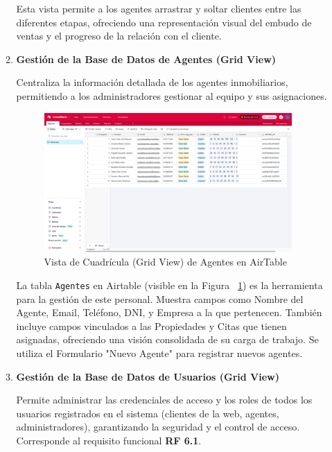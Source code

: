 \begin{enumerate}
\begin{enumerate}
        Esta vista permite a los agentes arrastrar y soltar clientes entre las diferentes etapas, ofreciendo una representación visual del embudo de ventas y el progreso de la relación con el cliente.
        
        \item \textbf{Gestión de la Base de Datos de Agentes (Grid View)}
        
        Centraliza la información detallada de los agentes inmobiliarios, permitiendo a los administradores gestionar al equipo y sus asignaciones.

        \begin{figure}[H]
            \begin{center}
                \includegraphics[width = 0.95\textwidth]{Figuras/gridviewagentesairtable.png}
            \end{center}
            \caption{\label{fig:gridviewagentesairtable} Vista de Cuadrícula (Grid View) de Agentes en AirTable}
        \end{figure}

        La tabla \texttt{Agentes} en Airtable (visible en la Figura ~\ref{fig:gridviewagentesairtable}) es la herramienta para la gestión de este personal. Muestra campos como Nombre del Agente, Email, Teléfono, DNI, y Empresa a la que pertenecen. También incluye campos vinculados a las Propiedades y Citas que tienen asignadas, ofreciendo una visión consolidada de su carga de trabajo. Se utiliza el Formulario "Nuevo Agente" para registrar nuevos agentes.

        \item \textbf{Gestión de la Base de Datos de Usuarios (Grid View)}
        
        Permite administrar las credenciales de acceso y los roles de todos los usuarios registrados en el sistema (clientes de la web, agentes, administradores), garantizando la seguridad y el control de acceso. Corresponde al requisito funcional \textbf{RF 6.1}.


\end{enumerate}
\end{enumerate}
